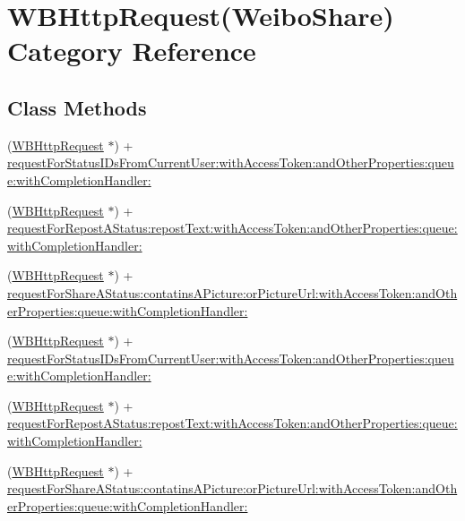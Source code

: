 \hypertarget{category_w_b_http_request_07_weibo_share_08}{}\section{W\+B\+Http\+Request(Weibo\+Share) Category Reference}
\label{category_w_b_http_request_07_weibo_share_08}
\subsection*{Class Methods}
\begin{DoxyCompactItemize}
\item 
(\mbox{\hyperlink{interface_w_b_http_request}{W\+B\+Http\+Request}} $\ast$) + \mbox{\hyperlink{category_w_b_http_request_07_weibo_share_08_ac75a0b99ef6dba004af29cd7c2498149}{request\+For\+Status\+I\+Ds\+From\+Current\+User\+:with\+Access\+Token\+:and\+Other\+Properties\+:queue\+:with\+Completion\+Handler\+:}}
\item 
(\mbox{\hyperlink{interface_w_b_http_request}{W\+B\+Http\+Request}} $\ast$) + \mbox{\hyperlink{category_w_b_http_request_07_weibo_share_08_ae32a41361851196fcf0ffc22b4354581}{request\+For\+Repost\+A\+Status\+:repost\+Text\+:with\+Access\+Token\+:and\+Other\+Properties\+:queue\+:with\+Completion\+Handler\+:}}
\item 
(\mbox{\hyperlink{interface_w_b_http_request}{W\+B\+Http\+Request}} $\ast$) + \mbox{\hyperlink{category_w_b_http_request_07_weibo_share_08_ad1a9992eb9534605e3b5d1100a2e693a}{request\+For\+Share\+A\+Status\+:contatins\+A\+Picture\+:or\+Picture\+Url\+:with\+Access\+Token\+:and\+Other\+Properties\+:queue\+:with\+Completion\+Handler\+:}}
\item 
(\mbox{\hyperlink{interface_w_b_http_request}{W\+B\+Http\+Request}} $\ast$) + \mbox{\hyperlink{category_w_b_http_request_07_weibo_share_08_ac75a0b99ef6dba004af29cd7c2498149}{request\+For\+Status\+I\+Ds\+From\+Current\+User\+:with\+Access\+Token\+:and\+Other\+Properties\+:queue\+:with\+Completion\+Handler\+:}}
\item 
(\mbox{\hyperlink{interface_w_b_http_request}{W\+B\+Http\+Request}} $\ast$) + \mbox{\hyperlink{category_w_b_http_request_07_weibo_share_08_ae32a41361851196fcf0ffc22b4354581}{request\+For\+Repost\+A\+Status\+:repost\+Text\+:with\+Access\+Token\+:and\+Other\+Properties\+:queue\+:with\+Completion\+Handler\+:}}
\item 
(\mbox{\hyperlink{interface_w_b_http_request}{W\+B\+Http\+Request}} $\ast$) + \mbox{\hyperlink{category_w_b_http_request_07_weibo_share_08_ad1a9992eb9534605e3b5d1100a2e693a}{request\+For\+Share\+A\+Status\+:contatins\+A\+Picture\+:or\+Picture\+Url\+:with\+Access\+Token\+:and\+Other\+Properties\+:queue\+:with\+Completion\+Handler\+:}}

\end{DoxyCompactItemize}

